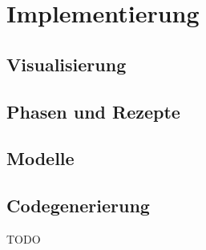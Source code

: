\chapter{Implementierung} \label{chapter:thevetestcase}
\section{Visualisierung}
\section{Phasen und Rezepte}
\section{Modelle}
\section{Codegenerierung}

TODO